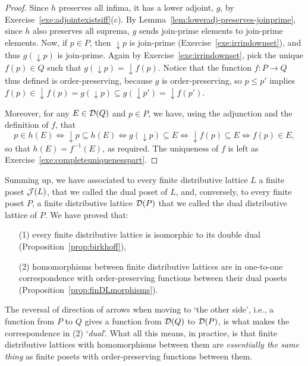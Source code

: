 \begin{proof}
Since $h$ preserves all infima, it has a lower adjoint, $g$, by Exercise~\ref{exe:adjointexistsiff}(c). By Lemma~\ref{lem:loweradj-preserves-joinprime}, since $h$ also preserves all suprema, $g$ sends join-prime elements to join-prime elements. Now, if $p \in P$, then ${\downarrow}p$ is join-prime (Exercise~\ref{exe:irrindownset}), and thus $g({\downarrow}p)$ is join-prime. Again by Exercise~\ref{exe:irrindownset}, pick the unique $f(p) \in Q$ such that $g({\downarrow}p) = {\downarrow}f(p)$.
Notice that the function $f \colon P \to Q$ thus defined is order-preserving, because $g$ is order-preserving, so $p \leq p'$ implies $f(p) \in {\downarrow} f(p) = g({\downarrow} p) \subseteq g({\downarrow} p') = {\downarrow} f(p')$.

Moreover, for any $E \in \mathcal{D}(Q)$ and $p \in P$, we have, using the adjunction and the definition of $f$, that
\[p \in h(E) \iff {\downarrow} p \subseteq h(E) \iff g({\downarrow}p) \subseteq E \iff {\downarrow} f(p) \subseteq E \iff f(p) \in E,\]
so that $h(E) = f^{-1}(E)$, as required.
The uniqueness of $f$ is left as Exercise~\ref{exe:completeuniquenesspart}.
\end{proof}


Summing up, we have associated to every finite distributive lattice $L$ a finite poset $\mathcal{J}(L)$, that we called the dual poset of $L$, and, conversely, to every finite poset $P$, a finite distributive lattice $\mathcal{D}(P)$ that we called the dual distributive lattice of $P$. We have proved that:
\begin{enumerate}
\item[(1)] every finite distributive lattice is isomorphic to its double dual (Proposition~\ref{prop:birkhoff}),
\item[(2)] homomorphisms between finite distributive lattices are in one-to-one correspondence with order-preserving functions between their dual posets (Proposition~\ref{prop:finDLmorphisms}).
\end{enumerate}
The reversal of direction of arrows when moving to `the other side', i.e., a function from $P$ to $Q$ gives a function from $\mathcal{D}(Q)$ to $\mathcal{D}(P)$, is what makes the correspondence in (2) `\emph{dual}'. What all this means, in practice, is that finite distributive lattices with homomorphisms between them are \emph{essentially the same thing} as finite posets with order-preserving functions between them.


